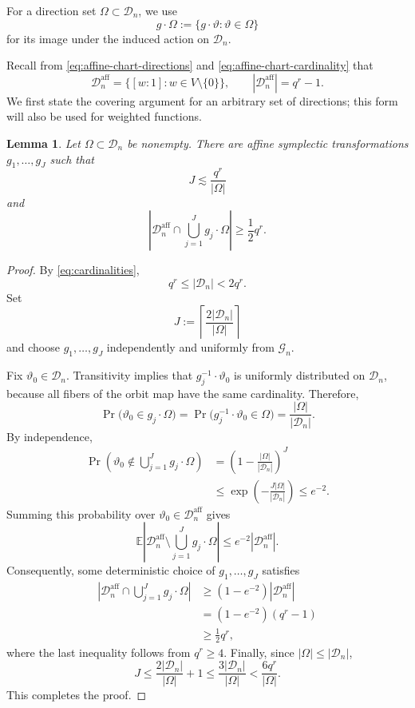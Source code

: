 \documentclass[11pt,letterpaper]{amsart}
\numberwithin{equation}{section}
\newtheorem{lemma}[lemma]{Lemma}
\theoremstyle{definition}
\theoremstyle{remark}
\newcommand{\Dn}{\mathcal D_n}
\begin{document}
For a direction set $\Omega\subset\Dn$, we use
\[
 g\cdot\Omega
 :=\{g\cdot\vartheta:\vartheta\in\Omega\}
\]
for its image under the induced action on $\Dn$.

Recall from \eqref{eq:affine-chart-directions} and
\eqref{eq:affine-chart-cardinality} that
\[
 \Dn^{\mathrm{aff}}
 =
 \{[w:1]:w\in V\setminus\{0\}\},
 \qquad
 |\Dn^{\mathrm{aff}}|=q^r-1.
\]
We first state the covering argument for an arbitrary set of directions;
this form will also be used for weighted functions.

\begin{lemma}
\label{lem:covering-direction-set}
Let $\Omega\subset\Dn$ be nonempty.  There are affine symplectic
transformations $g_1,\ldots,g_J$ such that
\[
 J\lesssim\frac{q^r}{|\Omega|}
\]
and
\[
 \left|
 \Dn^{\mathrm{aff}}\cap\bigcup_{j=1}^Jg_j\cdot\Omega
 \right|
 \geq\frac12q^r.
\]
\end{lemma}

\begin{proof}
By \eqref{eq:cardinalities},
\[
 q^r\leq|\Dn|<2q^r.
\]
Set
\[
 J:=\left\lceil\frac{2|\Dn|}{|\Omega|}\right\rceil
\]
and choose $g_1,\ldots,g_J$ independently and uniformly from
$\mathcal G_n$.

Fix $\vartheta_0\in\Dn$. Transitivity implies that
$g_j^{-1}\cdot\vartheta_0$ is uniformly distributed on $\Dn$, because
all fibers of the orbit map have the same cardinality. Therefore,
\[
 \Pr\bigl(\vartheta_0\in g_j\cdot\Omega\bigr)
 =
 \Pr\bigl(g_j^{-1}\cdot\vartheta_0\in\Omega\bigr)
 =
 \frac{|\Omega|}{|\Dn|}.
\]
By independence,
\begin{align*}
 \Pr\left(
 \vartheta_0\notin\bigcup_{j=1}^Jg_j\cdot\Omega
 \right)
 &=
 \left(1-\frac{|\Omega|}{|\Dn|}\right)^J\\
 &\leq
 \exp\left(-\frac{J|\Omega|}{|\Dn|}\right)
 \leq e^{-2}.
\end{align*}
Summing this probability over
$\vartheta_0\in\Dn^{\mathrm{aff}}$ gives
\[
 \mathbb E\left|
 \Dn^{\mathrm{aff}}\setminus
 \bigcup_{j=1}^Jg_j\cdot\Omega
 \right|
 \leq e^{-2}|\Dn^{\mathrm{aff}}|.
\]
Consequently, some deterministic choice of $g_1,\ldots,g_J$ satisfies
\begin{align*}
 \left|
 \Dn^{\mathrm{aff}}\cap
 \bigcup_{j=1}^Jg_j\cdot\Omega
 \right|
 &\geq(1-e^{-2})|\Dn^{\mathrm{aff}}|\\
 &=(1-e^{-2})(q^r-1)\\
 &\geq\frac12q^r,
\end{align*}
where the last inequality follows from $q^r\geq4$.  Finally, since
$|\Omega|\leq|\Dn|$,
\[
 J
 \leq\frac{2|\Dn|}{|\Omega|}+1
 \leq\frac{3|\Dn|}{|\Omega|}
 <\frac{6q^r}{|\Omega|}.
\]
This completes the proof.
\end{proof}
\end{document}
